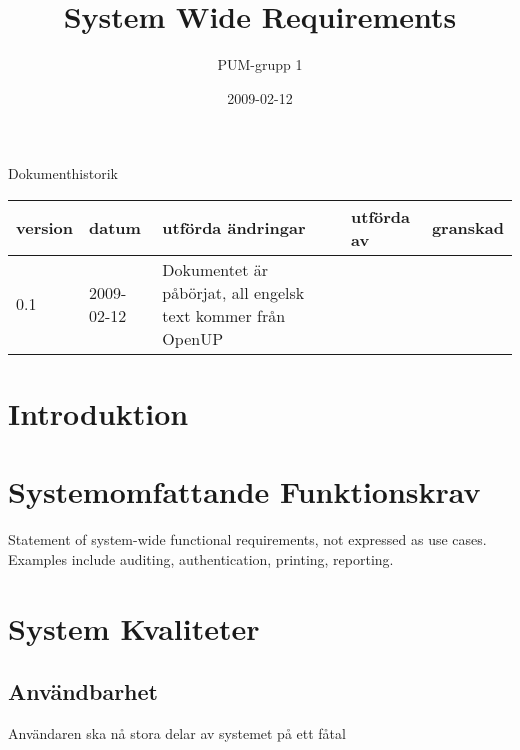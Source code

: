 

\ifpdf
\else
\fi

\title{System Wide Requirements}
\author{PUM-grupp 1}
\date{2009-02-12}



\maketitle\thispagestyle{empty}

\newpage

{\centering \Large{Dokumenthistorik\\}}

\vspace{10pt}
\begin{tabularx}{\textwidth}{ |l|l|X|l|l| }
  \hline
    \textbf{version} & \textbf{datum} & \textbf{utförda ändringar} & \textbf{utförda av} & \textbf{granskad} \\
	\hline 
  0.1 & 2009-02-12 &  Dokumentet är påbörjat, all engelsk text kommer från OpenUP    \\
  \hline
\end{tabularx}

\newpage

\setcounter{tocdepth}{2}
\tableofcontents
\newpage

\section{Introduktion}

\section{Systemomfattande Funktionskrav}

Statement of system-wide functional requirements, not expressed as use cases. Examples include auditing, authentication, printing, reporting.

\section{System Kvaliteter}
\subsection{Användbarhet}
Användaren ska nå stora delar av systemet på ett fåtal
